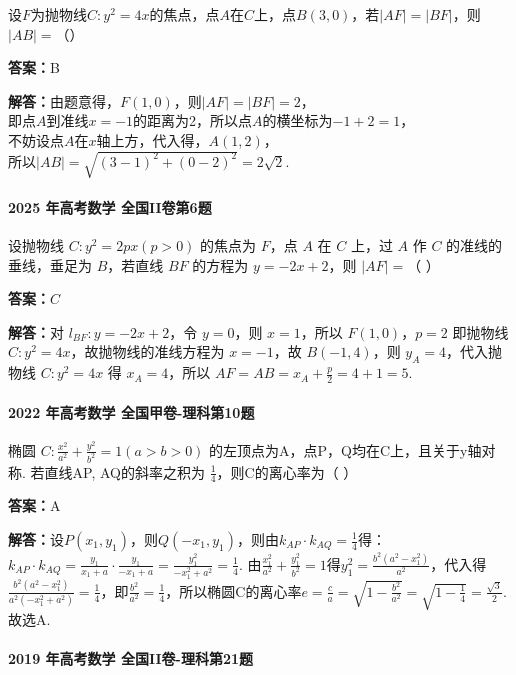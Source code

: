 \documentclass[UTF8,a4paper,11pt]{ctexart}
\begin{document}
设$F$为抛物线$C: y^2 = 4x$的焦点，点$A$在$C$上，点$B(3, 0)$，若$|AF| = |BF|$，则$|AB| =$（\qquad）

\textbf{答案：}B\par

\textbf{解答：}由题意得，$F(1,0)$，则$|AF| = |BF| = 2$，\\即点$A$到准线$x=-1$的距离为2，所以点$A$的横坐标为$-1+2=1$，\\不妨设点$A$在$x$轴上方，代入得，$A(1,2)$，\\所以$|AB| = \sqrt{(3-1)^2 + (0-2)^2} = 2\sqrt{2}$.

\paragraph{2025 年高考数学 全国II卷第6题}

设抛物线 $C:y^2=2px(p>0)$ 的焦点为 $F$，点 $A$ 在 $C$ 上，过 $A$ 作 $C$ 的准线的垂线，垂足为 $B$，若直线 $BF$ 的方程为 $y=-2x+2$，则 $|AF|=$（ ）

\textbf{答案：}$C$\par

\textbf{解答：}对 $l_{BF}:y=-2x+2$，令 $y=0$，则 $x=1$，所以 $F(1,0)$，$p=2$ 即抛物线 $C:y^2=4x$，故抛物线的准线方程为 $x=-1$，故 $B(-1,4)$，则 $y_A=4$，代入抛物线 $C:y^2=4x$ 得 $x_A=4$，所以 $AF=AB=x_A+\frac{p}{2}=4+1=5$.

\paragraph{2022 年高考数学 全国甲卷-理科第10题}

椭圆 $C:\frac{x^2}{a^2}+\frac{y^2}{b^2}=1(a>b>0)$ 的左顶点为A，点P，Q均在C上，且关于y轴对称. 若直线AP, AQ的斜率之积为 $\frac{1}{4}$，则C的离心率为（ ）

\textbf{答案：}A\par

\textbf{解答：}设$P(x_1,y_1)$，则$Q(-x_1,y_1)$，则由$k_{AP}\cdot k_{AQ}=\frac{1}{4}$得：$k_{AP}\cdot k_{AQ}=\frac{y_1}{x_1+a}\cdot\frac{y_1}{-x_1+a}=\frac{y_1^2}{-x_1^2+a^2}=\frac{1}{4}$. 由$\frac{x_1^2}{a^2}+\frac{y_1^2}{b^2}=1$得$y_1^2=\frac{b^2(a^2-x_1^2)}{a^2}$，代入得$\frac{b^2(a^2-x_1^2)}{a^2(-x_1^2+a^2)}=\frac{1}{4}$，即$\frac{b^2}{a^2}=\frac{1}{4}$，所以椭圆C的离心率$e=\frac{c}{a}=\sqrt{1-\frac{b^2}{a^2}}=\sqrt{1-\frac{1}{4}}=\frac{\sqrt{3}}{2}$. 故选A.

\paragraph{2019 年高考数学 全国II卷-理科第21题}
\end{document}
